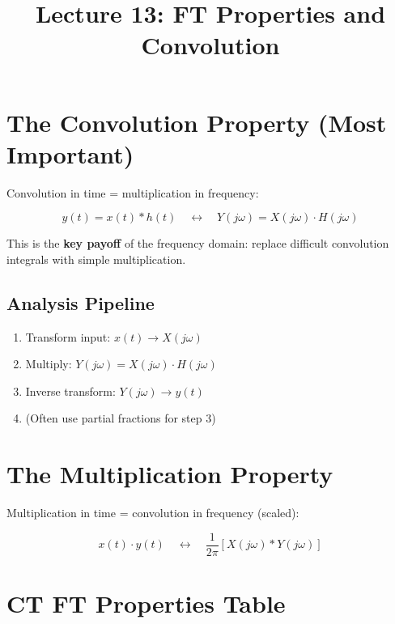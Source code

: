 \documentclass[11pt]{article}
\title{Lecture 13: FT Properties and Convolution}
\author{}
\date{}
\begin{document}
\maketitle

\section*{The Convolution Property (Most Important)}

Convolution in time = multiplication in frequency:

\[y(t) = x(t) * h(t) \quad \longleftrightarrow \quad Y(j\omega) = X(j\omega) \cdot H(j\omega)\]

This is the \textbf{key payoff} of the frequency domain: replace difficult convolution integrals with simple multiplication.

\subsection*{Analysis Pipeline}

\begin{enumerate}
  \item Transform input: $x(t) \to X(j\omega)$
  \item Multiply: $Y(j\omega) = X(j\omega) \cdot H(j\omega)$
  \item Inverse transform: $Y(j\omega) \to y(t)$
  \item (Often use partial fractions for step 3)
\end{enumerate}

\section*{The Multiplication Property}

Multiplication in time = convolution in frequency (scaled):

\[x(t) \cdot y(t) \quad \longleftrightarrow \quad \frac{1}{2\pi} [X(j\omega) * Y(j\omega)]\]

\section*{CT FT Properties Table}
\end{document}
